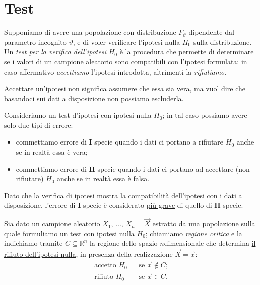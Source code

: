     \section{Test}
        \begin{defn}
            Supponiamo di avere una popolazione con distribuzione $F_\vartheta$ dipendente dal parametro 
            incognito $\vartheta$, e di voler verificare l'ipotesi nulla $H_0$ sulla distribuzione.
            Un \emph{test per la verifica dell'ipotesi} $H_0$ è la procedura che permette di determinare se 
            i valori di un campione aleatorio sono compatibili con l'ipotesi formulata: in caso affermativo 
            \emph{accettiamo} l'ipotesi introdotta, altrimenti la \emph{rifiutiamo}.
        \end{defn}
        \begin{note}
            Accettare un'ipotesi non significa assumere che essa sia vera, ma vuol dire che basandoci sui 
            dati a disposizione non possiamo escluderla.
        \end{note}
        \begin{defn}
            Consideriamo un test d'ipotesi con ipotesi nulla $H_0$; in tal caso possiamo avere solo due tipi 
            di errore:
            \begin{itemize}
                \item commettiamo errore di $\mathbf{I}$ specie quando i dati ci portano a rifiutare $H_0$ 
                    anche se in realtà essa è vera;
                \item commettiamo errore di $\mathbf{II}$ specie quando i dati ci portano ad accettare (non rifiutare) 
                    $H_0$ anche se in realtà essa è falsa.
            \end{itemize}
            Dato che la verifica di ipotesi mostra la compatibilità dell'ipotesi con i dati a disposizione, 
            l'errore di $\mathbf{I}$ specie è considerato \underline{più grave} di quello di $\mathbf{II}$ specie.
        \end{defn}
        \begin{defn}
            Sia dato un campione aleatorio $X_1,\, \ldots,\, X_{n} = \vec{X}$ estratto da una popolazione sulla 
            quale formuliamo un test con ipotesi nulla $H_0$; chiamiamo \emph{regione critica} e la indichiamo 
            tramite $C \subseteq \mathbb{R}^n$ la regione dello spazio $n$\nbdash dimensionale che determina 
            \underline{il rifiuto dell'ipotesi nulla}, in presenza della realizzazione $\vec{X} = \vec{x}$:
            \begin{align*}
                \text{accetto } H_0 & \;\;\; \text{se $\vec{x} \notin C$;} \\
                \text{rifiuto } H_0 & \;\;\; \text{se $\vec{x} \in C$.}
            \end{align*}
        \end{defn}
